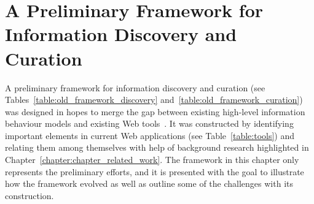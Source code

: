 \chapter{A Preliminary Framework for Information Discovery and Curation}
\label{chapter:old_framework}
A preliminary framework for information discovery and curation (see Tables~\ref{table:old_framework_discovery} and~\ref{table:old_framework_curation}) was designed in hopes to merge the gap between existing high-level information behaviour models and existing Web tools~\cite{voyloshnikova2014}. It was constructed by identifying important elements in current Web applications (see Table~\ref{table:tools}) and relating them among themselves with help of background research highlighted in Chapter~\ref{chapter:chapter_related_work}. The framework in this chapter only represents the preliminary efforts, and it is presented with the goal to illustrate how the framework evolved as well as outline some of the challenges with its construction.  

